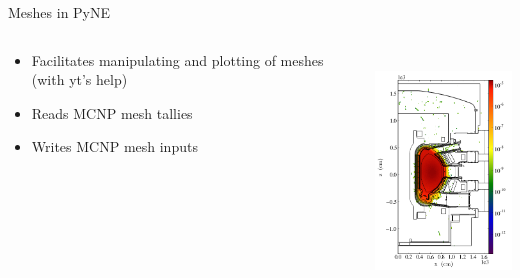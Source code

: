 \documentclass[xcolor=x11names,compress]{beamer}
\begin{document}
\begin{frame}{Meshes in PyNE}
    \begin{columns}
        \begin{column}{0.45\textwidth}
            \begin{itemize}
                \item Facilitates manipulating and plotting of meshes (with yt's help)
                \item Reads MCNP mesh tallies
                \item Writes MCNP mesh inputs
            \end{itemize}
  	    \end{column}
 	    \begin{column}{0.45\textwidth}
            \includegraphics[height=2.5in,clip]{flux_slice.png}
        \end{column}
    \end{columns}


\end{frame}
\end{document}
